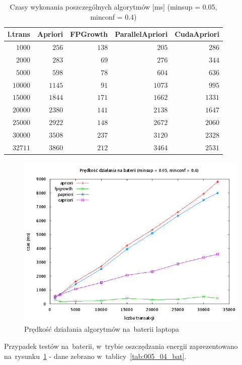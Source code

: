 \begin{table}
	\centering
	\begin{tabular}{r|r|r|r|r}
	\textbf{l.trans} & \textbf{Apriori} & \textbf{FPGrowth} & \textbf{ParallelApriori} & \textbf{CudaApriori}  \\ \hline
	$1000$ & $256$ & $138$ & $205$ & $286$ \\
	$2000$ & $283$ & $69$ & $276$ & $344$ \\
	$5000$ & $598$ & $78$ & $604$ & $636$ \\
	$10000$ & $1145$ & $91$ & $1073$ & $995$ \\
	$15000$ & $1844$ & $171$ & $1662$ & $1331$ \\
	$20000$ & $2380$ & $141$ & $2138$ & $1647$ \\
	$25000$ & $2922$ & $148$ & $2672$ & $2060$ \\
	$30000$ & $3508$ & $237$ & $3120$ & $2328$ \\
	$32711$ & $3860$ & $212$ & $3464$ & $2531$ \\
	\end{tabular}
	\caption{Czasy wykonania poszczególnych algorytmów [ms] (minsup = 0.05, minconf = 0.4)\label{tab:005_04}}
\end{table}

\begin{figure}[H]
\centering
\includegraphics[width=1\textwidth]{figures/06/005_04_bat.png}
\caption{Prędkość działania algorytmów na~baterii laptopa\label{rys:005_04_bat}}
\end{figure}

Przypadek testów na~baterii, w~trybie oszczędzania energii zaprezentowano na~rysunku~\ref{rys:005_04_bat} - dane zebrano w~tablicy~\ref{tab:005_04_bat}. 

